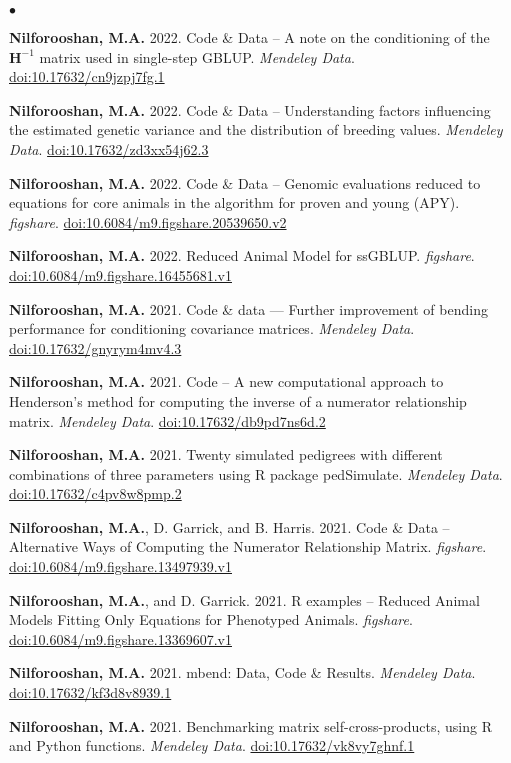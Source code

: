 \documentclass[margin,line]{res}
\newenvironment{list2}{
  \begin{list}{$\bullet$}{%
      \setlength{\itemsep}{0in}
      \setlength{\parsep}{0in} \setlength{\parskip}{0in}
      \setlength{\topsep}{0in} \setlength{\partopsep}{0in}
      \setlength{\leftmargin}{0.2in}}}{\end{list}}
\begin{document}
\begin{resume}
\begin{list2}
\item {\bf Nilforooshan, M.A.} 2022. Code \& Data -- A note on the conditioning of the $\mathbf H^{-1}$ matrix used in single-step GBLUP. {\em Mendeley Data}. \href{https://doi.org/10.17632/cn9jzpj7fg.1}{doi:10.17632/cn9jzpj7fg.1}
\item {\bf Nilforooshan, M.A.} 2022. Code \& Data -- Understanding factors influencing the estimated genetic variance and the distribution of breeding values. {\em Mendeley Data}. \href{https://doi.org/10.17632/zd3xx54j62.3}{doi:10.17632/zd3xx54j62.3}
\item {\bf Nilforooshan, M.A.} 2022. Code \& Data -- Genomic evaluations reduced to equations for core animals in the algorithm for proven and young (APY). {\em figshare}. \href{https://doi.org/10.6084/m9.figshare.20539650.v1}{doi:10.6084/m9.figshare.20539650.v2}
\item {\bf Nilforooshan, M.A.} 2022. Reduced Animal Model for ssGBLUP. {\em figshare}. \href{https://doi.org/10.6084/m9.figshare.16455681.v1}{doi:10.6084/m9.figshare.16455681.v1}
\item {\bf Nilforooshan, M.A.} 2021. Code \& data --- Further improvement of bending performance for conditioning covariance matrices. {\em Mendeley Data}. \href{https://doi.org/10.17632/gnyrym4mv4.3}{doi:10.17632/gnyrym4mv4.3}
\item {\bf Nilforooshan, M.A.} 2021. Code -- A new computational approach to Henderson’s method for computing the inverse of a numerator relationship matrix. {\em Mendeley Data}. \href{https://doi.org/10.17632/db9pd7ns6d.2}{doi:10.17632/db9pd7ns6d.2}
\item {\bf Nilforooshan, M.A.} 2021. Twenty simulated pedigrees with different combinations of three parameters using R package pedSimulate. {\em Mendeley Data}. \href{https://doi.org/10.17632/c4pv8w8pmp.2}{doi:10.17632/c4pv8w8pmp.2}
\item {\bf Nilforooshan, M.A.}, D. Garrick, and B. Harris. 2021. Code \& Data -- Alternative Ways of Computing the Numerator Relationship Matrix. {\em figshare}. \href{https://doi.org/10.6084/m9.figshare.13497939.v1}{doi:10.6084/m9.figshare.13497939.v1}
\item {\bf Nilforooshan, M.A.}, and D. Garrick. 2021. R examples -- Reduced Animal Models Fitting Only Equations for Phenotyped Animals. {\em figshare}. \href{https://doi.org/10.6084/m9.figshare.13369607.v1}{doi:10.6084/m9.figshare.13369607.v1}
\item {\bf Nilforooshan, M.A.} 2021. mbend: Data, Code \& Results. {\em Mendeley Data}. \href{https://doi.org/10.17632/kf3d8v8939.1}{doi:10.17632/kf3d8v8939.1}
\item {\bf Nilforooshan, M.A.} 2021. Benchmarking matrix self-cross-products, using R and Python functions. {\em Mendeley Data}. \href{https://doi.org/10.17632/vk8vy7ghnf.1}{doi:10.17632/vk8vy7ghnf.1}
\end{list2}

\end{resume}
\end{document}
